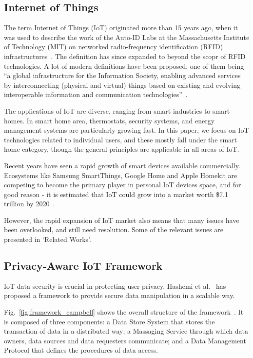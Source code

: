 \subsection{Internet of Things}
The term Internet of Things (IoT) originated more than 15 years ago, when it was used to describe the work of the Auto-ID Labs at the
Massachusetts Institute of Technology (MIT) on networked radio-frequency identification (RFID) infrastructures~\cite{atzori}. The definition has since expanded to beyond the scopr of RFID technologies. A lot of modern definitions have been proposed, one of them being ``a global infrastructure for the Information Society, enabling advanced services by interconnecting (physical and virtual) things based on existing and evolving interoperable information and communication technologies''~\cite{itu}.

The applications of IoT are diverse, ranging from smart industries to smart homes. In smart home area, thermostats, security systems, and energy management systems are particularly growing fast. In this paper, we focus on IoT technologies related to individual users, and these mostly fall under the smart home category, though the general principles are applicable in all areas of IoT.

Recent years have seen a rapid growth of smart devices available commercially. Ecosystems like Samsung SmartThings, Google Home and Apple Homekit are competing to become the primary player in personal IoT devices space, and for good reason -  it is estimated that IoT could grow into a market worth \$7.1 trillion by 2020~\cite{idc}.

However, the rapid expansion of IoT market also means that many issues have been overlooked, and still need resolution. Some of the relevant issues are presented in `Related Works'.

\subsection{Privacy-Aware IoT Framework}
IoT data security is crucial in protecting user privacy. Hashemi et al.~\cite{campbell} has proposed a framework to provide secure data manipulation in a scalable way.

Fig.~\ref{fig:framework_campbell} shows the overall structure of the framework~\cite{campbell}. It is composed of three components: a Data Store System that stores the transaction of data in a distributed way; a Massaging Service through which data owners, data sources and data requesters communicate; and a Data Management Protocol that defines the procedures of data access.


